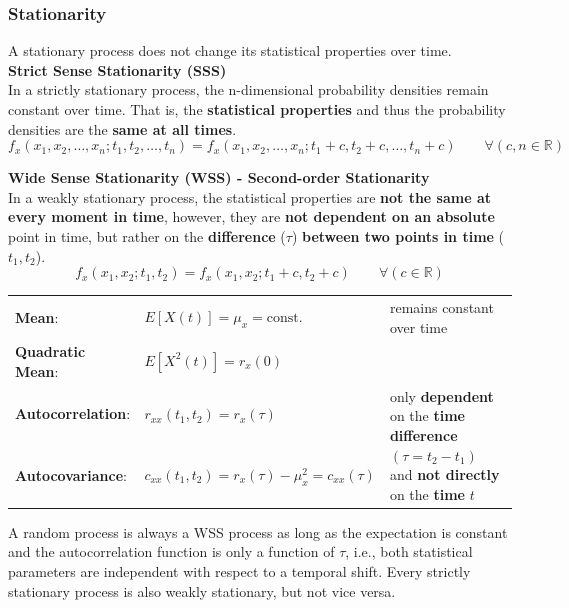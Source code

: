 		\subsubsection{Stationarity}
		A stationary process does not change its statistical properties over time. \\

		\textbf{Strict Sense Stationarity (SSS)}\\
		In a strictly stationary process, the n-dimensional probability densities remain constant over
		time. That is, the \textbf{statistical properties} and thus the probability densities are the
		\textbf{same at all times}.
		$$ f_x(x_1, x_2, \ldots, x_n; t_1, t_2, \ldots, t_n) =
				f_x(x_1, x_2, \ldots, x_n; t_1+c, t_2+c, \ldots, t_n+c) \qquad \forall (c,n \in
				\mathbb{R})$$

		\textbf{Wide Sense Stationarity (WSS) - Second-order Stationarity}\\
		In a weakly stationary process, the statistical properties are \textbf{not the same at every
		moment in time}, however, they are \textbf{not dependent on an absolute} point in time, but
		rather on the \textbf{difference} ($\tau$) \textbf{between two points in time} ($t_1, t_2$).  \\
		$$ f_x(x_1, x_2; t_1, t_2) = f_x(x_1, x_2; t_1+c, t_2+c) \qquad \forall (c \in
				\mathbb{R})$$
		\renewcommand{\arraystretch}{1.4}
		\begin{tabular}[c]{ p{3.3cm}  p{6.5cm} p{8cm} }
			\textbf{Mean}:     &  $E[X(t)] = \mu_{x} = \text{const.}$
									& remains constant over time\\
			\textbf{Quadratic Mean}:    &  $E[X^{2}(t)] = r_{x}(0)$  \\
			\textbf{Autocorrelation}:   &   $r_{xx}(t_{1},t_{2}) = r_{x}(\tau)$
			& \multirow{2}{8cm}{only \textbf{dependent} on the \textbf{time difference} $(\tau = t_2 - t_1)$ and \textbf{not directly} on
			 the \textbf{time} $t$} \\
			 \textbf{Autocovariance}:        & $ c_{xx}(t_{1},t_{2}) = r_{x}(\tau) - \mu_{x}^{2} = c_{xx}(\tau)$ \\
		\end{tabular}
		\renewcommand{\arraystretch}{1}

		A random process is always a WSS process as long as the expectation is constant and the autocorrelation function is only a function of $\tau$, i.e., both
		statistical parameters are independent with respect to a temporal shift.
		Every strictly stationary process is also weakly stationary, but not vice versa.

